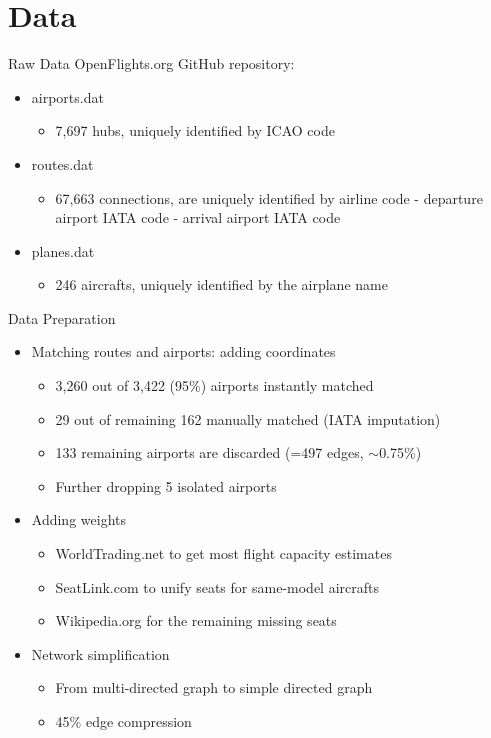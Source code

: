 \documentclass[10pt]{beamer}
\begin{document}
\section{Data}
\begin{frame}{Raw Data}
OpenFlights.org GitHub repository:
    \begin{itemize}
        \item airports.dat
        \begin{itemize}
            \item 7,697 hubs, uniquely identified by ICAO code
        \end{itemize}
        \item routes.dat
        \begin{itemize}
            \item 67,663 connections, are uniquely identified by airline code - departure airport IATA code - arrival airport IATA code
        \end{itemize}
        \item planes.dat
        \begin{itemize}
            \item 246 aircrafts, uniquely identified by the airplane name
        \end{itemize}
    \end{itemize}
\end{frame}
\begin{frame}{Data Preparation}
    \begin{itemize}
        \item Matching routes and airports: adding coordinates
        \begin{itemize}
            \item 3,260 out of 3,422 (95\%) airports instantly matched
            \item 29 out of remaining 162 manually matched (IATA imputation)
            \item 133 remaining airports are discarded (=497 edges, $\sim$0.75\%)
            \item Further dropping 5 isolated airports
        \end{itemize}
        \item Adding weights
        \begin{itemize}
            \item WorldTrading.net to get most flight capacity estimates
            \item SeatLink.com to unify seats for same-model aircrafts
            \item Wikipedia.org for the remaining missing seats
        \end{itemize}
        \item Network simplification
        \begin{itemize}
            \item From multi-directed graph to simple directed graph
            \item 45\% edge compression
        \end{itemize}
    \end{itemize}
\end{frame}
\end{document}
